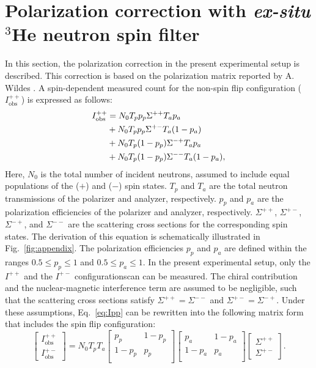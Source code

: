 \documentclass[%
 reprint,
superscriptaddress,
 amsmath,amssymb,
 aps,
floatfix,
]{revtex4-2}
\newcommand{\He}{$^3$He }
\begin{document}
\section{Polarization correction with \textit{ex-situ} \He neutron spin filter}
\label{appendix}
In this section, the polarization correction in the present experimental setup is described.
This correction is based on the polarization matrix reported by A. Wildes \cite{wildes_polarizer-analyzer_1999,wildes_scientific_2006}.
A spin-dependent measured count for the non-spin flip configuration ($I^{++}_\mathrm{obs}$) is expressed as follows:
\begin{align}
    I^{++}_\mathrm{obs} &= N_0 T_p p_p \Sigma^{++} T_a p_a \notag \\
    &+ N_0 T_p p_p \Sigma^{+-} T_a (1-p_a) \notag\\
    &+N_0 T_p (1-p_p) \Sigma^{-+} T_a p_a \notag \\
    &+ N_0 T_p (1-p_p) \Sigma^{--} T_a (1-p_a),
    \label{eq:Ipp}
\end{align}
Here, $N_0$ is the total number of incident neutrons, assumed to include equal populations of the ($+$) and ($-$) spin states.
$T_p$ and $T_a$ are the total neutron transmissions of the polarizer and analyzer, respectively.
$p_p$ and $p_a$ are the polarization efficiencies of the polarizer and analyzer, respectively.
$\Sigma^{++}$, $\Sigma^{+-}$, $\Sigma^{-+}$, and $\Sigma^{--}$ are the scattering cross sections for the corresponding spin states.
The derivation of this equation is schematically illustrated in Fig.~\ref{fig:appendix}.
The polarization efficiencies $p_p$ and $p_a$ are defined within the ranges $0.5 \leq p_p \leq 1$ and $0.5 \leq p_a \leq 1$.
In the present experimental setup, only the $I^{++}$ and the $I^{+-}$ configurationscan can be measured.
The chiral contribution and the nuclear-magnetic interference term are assumed to be negligible, such that the scattering cross sections satisfy $\Sigma^{++} = \Sigma^{--}$ and $\Sigma^{+-} = \Sigma^{-+}$.
Under these assumptions, Eq.~\ref{eq:Ipp} can be rewritten into the following matrix form that includes the spin flip configuration:
\begin{equation}
    \begin{bmatrix}
        I^{++}_\mathrm{obs} \\
        I^{+-}_\mathrm{obs}
    \end{bmatrix}
    =
    N_0T_pT_a
    \begin{bmatrix}
        p_p & 1-p_p \\
        1-p_p & p_p \\
    \end{bmatrix}
    \begin{bmatrix}
        p_a&1-p_a \\
        1-p_a&p_a \\
    \end{bmatrix}
    \begin{bmatrix}
        \Sigma^{++} \\
        \Sigma^{+-}
    \end{bmatrix}.
    \label{eq:Ipp_Ipm}
\end{equation}
\end{document}
